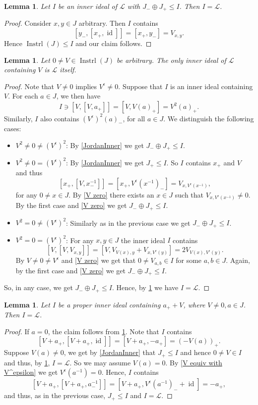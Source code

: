 \documentclass[oneside,a4paper]{amsart} %
\newtheorem{lemma}[theorem]{Lemma}
\theoremstyle{definition}
\DeclareMathOperator{\Inst}{Instrl}
\DeclareMathOperator{\id}{id}
\newcommand{\LL}{\mathcal{L}}
\numberwithin{equation}{section}
\begin{document}
\begin{lemma}
\label{I contains Jordans}
	Let $I$ be an inner ideal of $\LL$ with $J_-\oplus J_+\leq I$. 
	Then $I=\LL$.
\end{lemma}
\begin{proof}
	Consider $x,y\in J$ arbitrary.
	Then $I$ contains
	\[ [y_-,[x_+,\id]]=[x_+,y_-]=V_{x,y}.\]
	Hence $\Inst (J)\leq I$ and our claim follows.
\end{proof}

\begin{lemma}
\label{Inner0}
	Let $0\neq V\in  \Inst(J)$ be arbitrary. 
	The only inner ideal of $\LL$ containing $V$ is $\LL$ itself.
\end{lemma}
\begin{proof}
	Note that $V\neq 0$ implies $V^\epsilon \neq 0$.
	Suppose that $I$ is an inner ideal containing $V$.
	For each $a \in J$, we then have
	\[ I \ni [V,[V,a_+]] = [V,V(a)_+] = V^2(a)_+ . \]
	Similarly, $I$ also contains $(V^{\epsilon})^2(a)_-$, for all $a\in J$.
	We distinguish the following cases:
	\begin{itemize}
		\item $V^2\neq 0\neq (V^{\epsilon})^2$: By \cref{JordanInner} we get $J_-\oplus J_+\leq I$. 
		\item $V^2\neq 0 = (V^\epsilon)^2$: By \cref{JordanInner} we get $J_+\leq I$. 
				So $I$ contains $x_+$ and $V$ and thus
				\[ [x_+,[V,x^{-1}_-]]=[x_+,V^\epsilon(x^{-1})_-]=V_{x,V^\epsilon(x^{-1})}, \]
			for any $0\neq x\in J$. 
			By \cref{V zero} there exists an $x\in J$ such that $V_{x,V^\epsilon(x^{-1})}\neq 0$.
			By the first case and \cref{V zero} we get $J_-\oplus J_+\leq I$. 
		\item $V^2= 0 \neq (V^\epsilon)^2$: Similarly as in the previous case we get $J_-\oplus J_+\leq I$.
		\item $V^2=0=(V^\epsilon)^2$: For any $x,y\in J$ the inner ideal $I$ contains 
		 \[ [V,[V,V_{x,y}]]=[V,V_{V(x),y}+V_{x,V^{\epsilon}(y)}]=2V_{V(x),V^\epsilon(y)}.\] 
		 By $V\neq0\neq V^\epsilon$ and \cref{V zero} we get that $0\neq V_{a,b}\in I$ for some $a,b\in J$.
		 Again, by the first case and \cref{V zero} we get $J_-\oplus J_+\leq I$.
	\end{itemize}
	So, in any case, we get $J_-\oplus J_+\leq I$.
	Hence, by \cref{I contains Jordans} we have $I=\LL$.
\end{proof}

\begin{lemma}
\label{Inner01}
	Let $I$ be a proper inner ideal containing $a_++V$, where $V\neq 0, a\in J$.
	Then $I=\LL$.
\end{lemma}
\begin{proof}
	If $a=0$, the claim follows from \cref{Inner0}.
	Note that $I$ contains
	\[ [V+a_+,[V+a_+,\id]]=[V+a_+,-a_+]=(-V(a))_+.\]
	Suppose $V(a)\neq 0$, we get by \cref{JordanInner} that $J_+\leq I$ and hence $0\neq V\in I$ and thus, by \cref{Inner0}, $I=\LL$.
	So we may assume $V(a)=0$. 
	By \cref{V equiv with V^epsilon} we get $V^\epsilon(a^{-1})=0$.
	Hence, $I$ contains
	\[ [V+a_+,[V+a_+,a^{-1}_-]]=[V+a_+,V^\epsilon(a^{-1})_-+\id]=-a_+, \]
	and thus, as in the previous case, $J_+\leq I$ and $I=\LL$.
	\end{proof}
\end{document}
